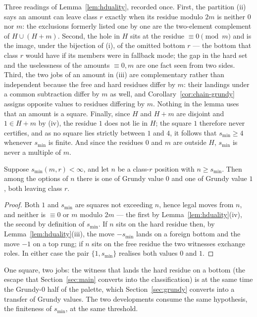 \begin{remark}\label{rem:hduality-readings}
Three readings of Lemma~\ref{lem:hduality}, recorded once. First, the
partition (ii) says an amount can leave class $r$ exactly when its
residue modulo $2m$ is neither $0$ nor $m$: the exclusions formerly
listed one by one are the two-element complement of $H \cup (H+m)$.
Second, the hole in $H$ sits at the residue $\equiv 0 \pmod m$ and is the
image, under the bijection of (i), of the omitted bottom $r$ --- the
bottom that class $r$ would have if its members were in fallback mode;
the gap in the hard set and the uselessness of the amounts $\equiv 0, m$
are one fact seen from two sides. Third, the two jobs of an amount in
(iii) are complementary rather than independent because the free and hard
residues differ by $m$: their landings under a common subtraction differ
by $m$ as well, and Corollary~\ref{cor:chain-grundy} assigns opposite
values to residues differing by $m$. Nothing in the lemma uses that an
amount is a square. Finally, since $H$ and $H+m$ are disjoint and
$1 \in H+m$ by (iv), the residue $1$ does not lie in $H$; the square
$1$ therefore never certifies, and as no square lies strictly between
$1$ and $4$, it follows that $s_{\min} \ge 4$ whenever
$s_{\min}$ is finite. And since the residues $0$ and $m$ are outside
$H$, $s_{\min}$ is never a multiple of $m$.
\end{remark}

\begin{corollary}[Palette]\label{cor:palette}
Suppose $s_{\min}(m,r) < \infty$, and let $n$ be a class-$r$ position
with $n \ge s_{\min}$. Then among the options of $n$ there is one of
Grundy value $0$ and one of Grundy value $1$, both leaving class $r$.
\end{corollary}
\begin{proof}
Both $1$ and $s_{\min}$ are squares not exceeding $n$, hence legal moves
from $n$, and neither is $\equiv 0$ or $m$ modulo $2m$ --- the first by
Lemma~\ref{lem:hduality}(iv), the second by definition of $s_{\min}$. If
$n$ sits on the hard residue then, by Lemma~\ref{lem:hduality}(iii), the
move $-s_{\min}$ lands on a foreign bottom and the move $-1$ on a top
rung; if $n$ sits on the free residue the two witnesses exchange roles.
In either case the pair $\{1, s_{\min}\}$ realises both values $0$ and
$1$.
\end{proof}

One square, two jobs: the witness that lands the hard residue on a bottom
(the escape that Section~\ref{sec:main} converts into the
classification) is at the same time the Grundy-$0$ half of the
palette, which Section~\ref{sec:grundy} converts into a transfer of
Grundy values. The
two developments consume the same hypothesis, the finiteness of
$s_{\min}$, at the same threshold.

